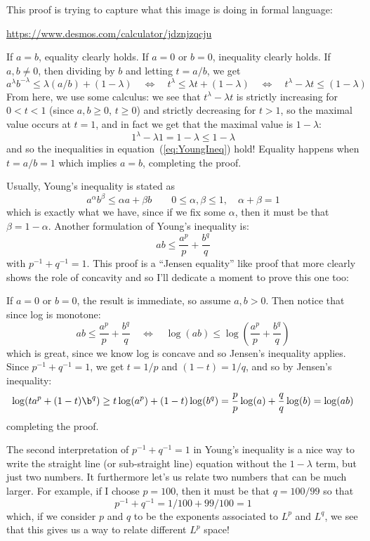 \documentclass[oneside]{book}
\newcommand{\LRw}{\Leftrightarrow}
\begin{document}
\begin{Proof}
	This proof is trying to capture what this image is doing in formal language:
	\begin{center}
		\url{https://www.desmos.com/calculator/jdznjzqcju}
	\end{center}

	If $a= b$, equality clearly holds. If $a = 0$ or $b = 0$, inequality clearly holds. If $a,b \ne 0$, then dividing by $b$ and letting $t = a/b$, we
	get
	\begin{equation}\label{eq:YoungIneq}
		a^\lambda b^{-\lambda} \le \lambda(a/b) + (1-\lambda) \quad \LRw\quad t^\lambda \le \lambda t + (1-\lambda)\quad
		\LRw\quad t^\lambda - \lambda t \le (1-\lambda)
	\end{equation}
	From here, we use some calculus: we see that $t^\lambda - \lambda t$ is strictly
	increasing for $0 < t < 1$ (since $a,b \ge 0$, $t \ge 0$) and strictly decreasing for $t > 1$, so the maximal value occurs at $t = 1$, and in fact we
	get that the maximal value is $1 - \lambda$:
	\[
		1^\lambda - \lambda 1 = 1- \lambda \le 1- \lambda
	\]
	and so the inequalities in equation~(\ref{eq:YoungIneq}) hold! Equality happens when $t = a/b = 1$ which implies $a=
	b$, completing the proof. 
\end{Proof}

Usually, Young's inequality is stated as 
\[
	a^\alpha b^\beta \le \alpha a + \beta b \qquad 0 \le \alpha,\beta \le 1,\quad \alpha + \beta = 1
\]
which is exactly what we have, since if we fix some $\alpha$, then it must be that $\beta = 1-\alpha$. Another
formulation of Young's inequality is:
\[
	ab \le \frac{a^p}{p} + \frac{b^q}{q}
\]
with $p^{-1} + q^{-1} = 1$. This proof is a ``Jensen equality'' like proof that more clearly shows the role of concavity and so I'll dedicate
a moment to prove this one too:
\begin{Proof}
	If $a = 0$ or $b =0$, the result is immediate, so assume $a,b > 0$. Then notice that since log is monotone:
	\[
		ab \le \frac{a^p}{p} + \frac{b^q}{q}\quad \LRw\quad \log(ab) \le \log\left(\frac{a^p}{p} + \frac{b^q}{q}\right)
	\]
	which is great, since we know log is concave and so Jensen's inequality applies. Since $p^{-1} + q^{-1} = 1$, we get
	$t = 1/p$ and $(1-t) = 1/q$, and so by Jensen's inequality:
	\[
		\log(ta^p + (1-t)\b^q) \ge t\log(a^p) + (1-t)\log(b^q) = \frac{p}{p}\log(a) + \frac{q}{q}\log(b)
		= \log(ab)
	\]
	completing the proof. 
\end{Proof}

The second interpretation of $p^{-1} + q^{-1} = 1$ in Young's inequality is a nice way to write the straight line (or
sub-straight line) equation without the $1-\lambda$ term, but just two numbers. It furthermore let's us relate two
numbers that can be much larger. For example, if I choose $p
= 100$, then it must be that $q = 100/99$ so that 
\[
	p^{-1} + q^{-1} = 1/100 + 99/100 = 1
\]
which, if we consider $p$ and $q$ to be the exponents associated to $L^p$ and $L^q$, we see that this gives us a way to
relate different $L^p$ space! 
\end{document}
